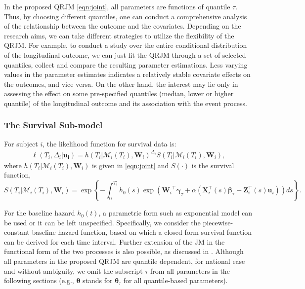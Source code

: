 In the proposed QRJM \eqref{eqn:joint}, all parameters are functions of quantile $\tau$. Thus, by choosing different quantiles, one can conduct a comprehensive analysis of the relationship between the outcome and the covariates. Depending on the research aims, we can take different strategies to utilize the flexibility of the QRJM. For example, to conduct a study over the entire conditional distribution of the longitudinal outcome, we can just fit the QRJM through a set of selected quantiles, collect and compare the resulting parameter estimations. Less varying values in the parameter estimates indicates a relatively stable covariate effects on the outcomes, and vice versa. On the other hand, the interest may lie only in assessing the effect on some pre-specified quantiles (median, lower or higher quantile) of the longitudinal outcome and its association with the event process.

\subsubsection{The Survival Sub-model}\label{sec:surv_submodel}
For subject $i$, the likelihood function for survival data is:
\begin{eqnarray}\label{eqn:survival_like}
\ell(T_i, \Delta_i|\boldsymbol{{\boldsymbol u}_i}) =h(T_i|\mathcal{M}_{i}(T_i), \boldsymbol{W}_i)^{\Delta_i}S(T_i|\mathcal{M}_{i}(T_i), \boldsymbol{W}_i),
\end{eqnarray}
where $h(T_i|\mathcal{M}_{i}(T_i), \boldsymbol{W}_i)$ is given in \eqref{eqn:joint} and $S(\cdot)$ is the survival function,
\begin{equation*}
S(T_i|\mathcal{M}_{i}(T_i), \boldsymbol{W}_i)=\exp\left\{-\int_0^{T_i}h_0(s)\exp({\boldsymbol W_i}^{\top}\boldsymbol{\gamma}_{\tau} + \alpha({\boldsymbol X}_i^{\top}(s)\boldsymbol{\beta}_{\tau} + {\boldsymbol Z}_i^{\top}(s){\boldsymbol u}_{i}))ds\right\}.
\end{equation*}

For the baseline hazard $h_0(t)$, a parametric form such as exponential model can be used or it can be left unspecified. Specifically, we consider the piecewise-constant baseline hazard function, based on which a closed form survival function can be derived for each time interval. Further extension of the JM in the functional form of the two processes is also possible, as discussed in \citet{rizopoulos2014combining}. Although all parameters in the proposed QRJM are quantile dependent, for national ease and without ambiguity, we omit the subscript $\tau$ from all parameters in the following sections (e.g., $\boldsymbol{\theta}$ stands for $\boldsymbol{\theta}_{\tau}$ for all quantile-based parameters).

